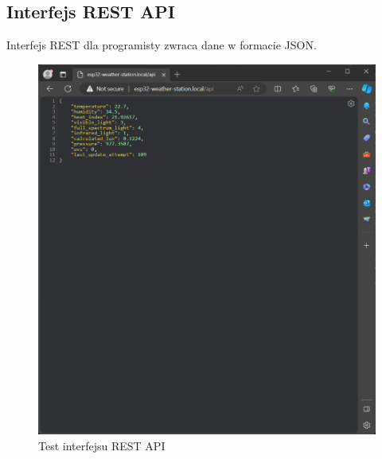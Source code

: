 \documentclass[12pt,a4paper]{article}
\begin{document}
\subsection{Interfejs REST API}
Interfejs REST dla programisty zwraca dane w formacie JSON.
\begin{figure}[H]
    \centering
    \includegraphics[width=\textwidth]{rest-api.png}
    \caption{Test interfejsu REST API}
\end{figure}
\end{document}

